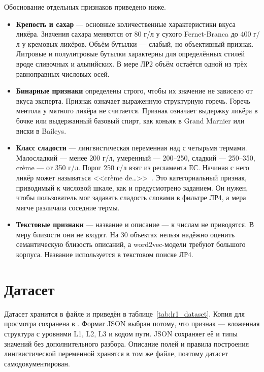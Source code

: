 Обоснование отдельных признаков приведено ниже.
\begin{itemize}[leftmargin=1.6\parindent, label*=---]
	\item \textbf{Крепость и сахар} --- основные количественные характеристики вкуса ликёра. Значения сахара меняются от 80 г/л у сухого Fernet-Branca до 400 г/л у кремовых ликёров. Объём бутылки --- слабый, но объективный признак. Литровые и полулитровые бутылки характерны для определённых стилей вроде сливочных и альпийских. В мере ЛР2 объём остаётся одной из трёх равноправных числовых осей.
	\item \textbf{Бинарные признаки} определены строго, чтобы их значение не зависело от вкуса эксперта. Признак  означает выраженную структурную горечь. Горечь ментола у мятного ликёра не считается. Признак  означает выдержку ликёра в бочке или выдержанный базовый спирт, как коньяк в Grand Marnier или виски в Baileys.
	\item \textbf{Класс сладости} --- лингвистическая переменная над  с четырьмя термами. Малосладкий --- менее 200 г/л, умеренный --- 200--250, сладкий --- 250--350, cr\`eme --- от 350 г/л. Порог 250 г/л взят из регламента ЕС. Начиная с него ликёр может называться <<cr\`eme de\ldots>>~\cite{eu-spirits}. Это категориальный признак, приводимый к числовой шкале, как и предусмотрено заданием. Он нужен, чтобы пользователь мог задавать сладость словами в фильтре ЛР4, а мера мягче различала соседние термы.
	\item \textbf{Текстовые признаки} --- название и описание --- к числам не приводятся. В меру близости они не входят. На 30 объектах нельзя надёжно оценить семантическую близость описаний, а word2vec-модели требуют большого корпуса. Название используется в текстовом поиске ЛР4.
\end{itemize}

\section{Датасет}

Датасет хранится в файле  и приведён в таблице~\ref{tab:lr1_dataset}. Копия для просмотра сохранена в . Формат JSON выбран потому, что признак  --- вложенная структура с уровнями L1, L2, L3 и кодом пути. JSON сохраняет её и типы значений без дополнительного разбора. Описание полей и правила построения лингвистической переменной хранятся в том же файле, поэтому датасет самодокументирован.

